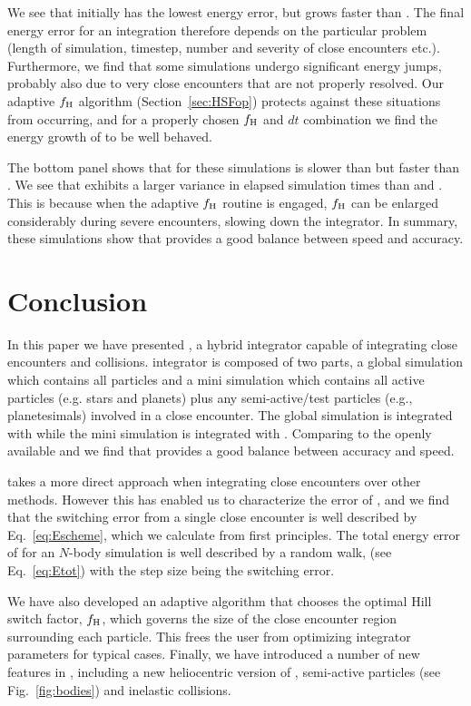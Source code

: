 We see that \hermes initially has the lowest energy error, but grows faster than \mercury.  
The final energy error for an integration therefore depends on the particular problem (length of simulation, timestep, number and severity of close encounters etc.).
Furthermore, we find that some \mercury simulations undergo significant energy jumps, probably also due to very close encounters that are not properly resolved. 
Our adaptive $f_{\rm H}$ algorithm (Section~\ref{sec:HSFop}) protects against these situations from occurring, and for a properly chosen $f_{\rm H}$ and $dt$ combination we find the energy growth of \hermes to be well behaved. 

The bottom panel shows that for these simulations \hermes is slower than \symba but faster than \mercury. 
We see that \hermes exhibits a larger variance in elapsed simulation times than \mercury and \symba. 
This is because when the adaptive $f_{\rm H}$ routine is engaged, $f_{\rm H}$ can be enlarged considerably during severe encounters, slowing down the integrator. 
In summary, these simulations show that \hermes provides a good balance between speed and accuracy.

\section{Conclusion}
\label{sec:Conclusion}
In this paper we have presented \hermes, a hybrid integrator capable of integrating close encounters and collisions. 
\hermes integrator is composed of two parts, a global simulation which contains all particles and a mini simulation which contains all active particles (e.g. stars and planets) plus any semi-active/test particles (e.g., planetesimals) involved in a close encounter.
The global simulation is integrated with \whfast while the mini simulation is integrated with \ias.
Comparing \hermes to the openly available \mercury and \symba we find that \hermes provides a good balance between accuracy and speed.

\hermes takes a more direct approach when integrating close encounters over other methods.
However this has enabled us to characterize the error of \hermes, and we find that the switching error from a single close encounter is well described by Eq.~\ref{eq:Escheme}, which we calculate from first principles.
The total energy error of \hermes for an $N$-body simulation is well described by a random walk, (see Eq.~\ref{eq:Etot}) with the step size being the switching error.

We have also developed an adaptive algorithm that chooses the optimal Hill switch factor, $f_{\rm H}$, which governs the size of the close encounter region surrounding each particle.
This frees the user from optimizing integrator parameters for typical cases. 
Finally, we have introduced a number of new features in \reb, including a new heliocentric version of \whfast, semi-active particles (see Fig.~\ref{fig:bodies}) and inelastic collisions.

